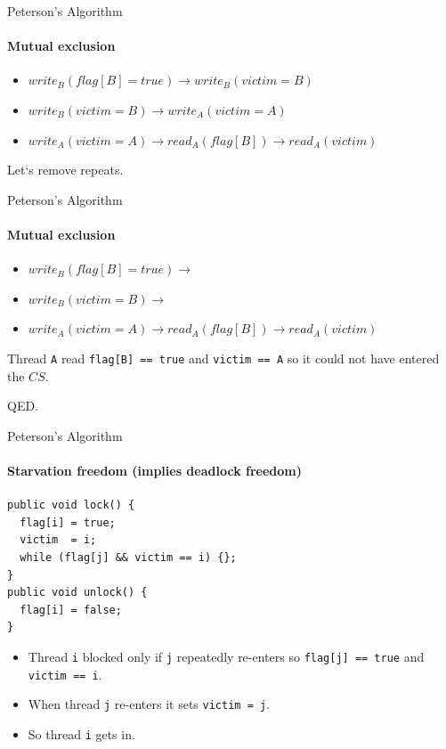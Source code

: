 \begin{frame}{Peterson’s Algorithm}
\framesubtitle{Mutual exclusion}
\begin{itemize}
  \item $write_{B}(flag[B] = true) \rightarrow write_{B}(victim = B)$
  \item $write_{B}(victim = B) \rightarrow write_{A}(victim = A)$
  \item $write_{A}(victim = A) \rightarrow read_{A}(flag[B]) \rightarrow read_{A}(victim)$ 
\end{itemize}

\pause

Let`s remove repeats.

\end{frame}

\begin{frame}{Peterson’s Algorithm}
\framesubtitle{Mutual exclusion}
\begin{itemize}
  \item $write_{B}(flag[B] = true) \rightarrow$
  \item $write_{B}(victim = B) \rightarrow$
  \item $write_{A}(victim = A) \rightarrow read_{A}(flag[B]) \rightarrow read_{A}(victim)$ 
\end{itemize}

\pause

Thread \texttt{A} read \texttt{flag[B] == true} and \texttt{victim == A} so it could not have entered the $CS$.

\pause

QED.
\end{frame}

\begin{frame}[fragile]{Peterson’s Algorithm}
\framesubtitle{Starvation freedom (implies deadlock freedom)}

\begin{verbatim}
public void lock() {
  flag[i] = true;
  victim  = i;
  while (flag[j] && victim == i) {};                                    
}
public void unlock() {
  flag[i] = false;
}
\end{verbatim}

\pause

\begin{itemize}
  \item Thread \texttt{i} blocked only if \texttt{j} repeatedly re-enters so \texttt{flag[j] == true} and \texttt{victim == i}.
  \pause
  \item When thread \texttt{j} re-enters it sets \texttt{victim = j}.
  \pause
  \item So thread \texttt{i} gets in.
\end{itemize}

\end{frame}

